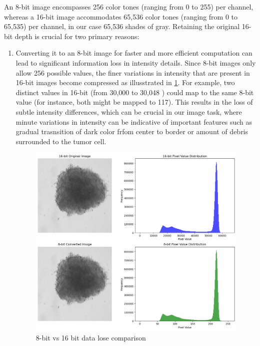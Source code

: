 An 8-bit image encompasses 256 color tones (ranging from 0 to 255) per channel, whereas a 16-bit image accommodates 65,536 color tones 
(ranging from 0 to 65,535) per channel, in our case 65,536 shades of gray. Retaining the original 16-bit depth is crucial for two primary reasons:
\begin{enumerate}
  \item Converting it to an 8-bit image for faster and more efficient computation can lead to significant information loss in intensity details.
Since 8-bit images only allow 256 possible values, the finer variations in intensity that are present in 16-bit images become compressed as illusstrated in \ref{fig:8bitvs16bit}.
For example, two distinct values in 16-bit (from 30,000 to 30,048 ) could map to the same 8-bit value (for instance, both might be mapped to 117).
This results in the loss of subtle intensity differences, which can be crucial in our image task, where minute variations in intensity can be indicative
 of important features such as gradual trasnsition of dark color frfom center to border or amount of debris surrounded to the tumor cell.


 \begin{figure}[H]
  \centering
  \includegraphics[scale=0.5]{figures/8bitvs16bit.png} 
  \caption{8-bit vs 16 bit data lose comparison}
  \label{fig:8bitvs16bit}
\end{figure}


\end{enumerate}

